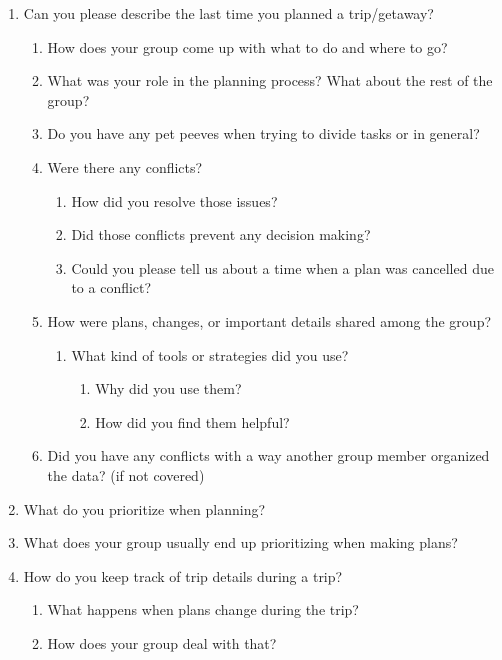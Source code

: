 \documentclass[12pt,a4paper]{article}
\begin{document}
\begin{enumerate}
    \item Can you please describe the last time you planned a trip/getaway? 
    \begin{enumerate}
        \item How does your group come up with what to do and where to go?
        \item What was your role in the planning process? What about the rest of the group?
        \item Do you have any pet peeves when trying to divide tasks or in general?
        \item Were there any conflicts?
        \begin{enumerate}
            \item How did you resolve those issues?
            \item Did those conflicts prevent any decision making?
            \item Could you please tell us about a time when a plan was cancelled due to a conflict?
        \end{enumerate}
        \item How were plans, changes, or important details shared among the group?
        \begin{enumerate}
            \item What kind of tools or strategies did you use?
            \begin{enumerate}
                \item Why did you use them? 
                \item How did you find them helpful?
            \end{enumerate}
        \end{enumerate}
        \item Did you have any conflicts with a way another group member organized the data? (if not covered)
    \end{enumerate}
    \item What do you prioritize when planning? 
    \item What does your group usually end up prioritizing when making plans?
    \item How do you keep track of trip details during a trip?
    \begin{enumerate}
        \item What happens when plans change during the trip? 
        \item How does your group deal with that?

\end{enumerate}
\end{enumerate}
\end{document}
